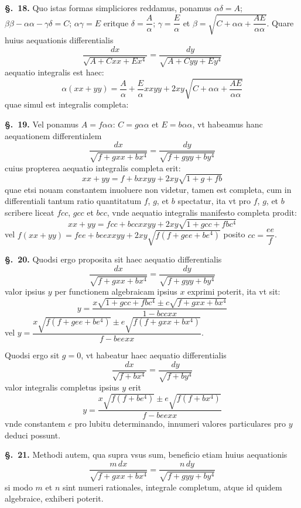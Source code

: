 \documentclass{article}
\begin{document}
\textbf{§.~18.} Quo istas formas simpliciores reddamus, ponamus $\alpha\delta = A$;
$\beta\beta - \alpha\alpha - \gamma\delta = C$; $\alpha\gamma = E$ eritque $\delta = \dfrac{A}{\alpha}$;
$\gamma = \dfrac{E}{\alpha}$ et $\beta = \sqrt{C + \alpha\alpha + \dfrac{AE}{\alpha\alpha}}$. Quare huius
aequationis differentialis
\[ \frac{dx}{\sqrt{A + Cxx + Ex^{4}}} = \frac{dy}{\sqrt{A + Cyy + Ey^{4}}} \tag{6} \]
aequatio integralis est haec:
\[ \alpha(xx + yy) = \frac{A}{\alpha} + \frac{E}{\alpha}xxyy + 2xy\sqrt{C + \alpha\alpha + \frac{AE}{\alpha\alpha}} \tag{7} \]
quae simul est integralis completa:

\textbf{§.~19.} Vel ponamus $A = f\alpha\alpha$: $C = g\alpha\alpha$ et $E = b\alpha\alpha$, vt
habeamus hanc aequationem differentialem
\[ \frac{dx}{\sqrt{f + gxx + bx^{4}}} = \frac{dy}{\sqrt{f + gyy + by^{4}}} \]
cuius propterea aequatio integralis completa erit:
\[ xx + yy = f + bxxyy + 2xy\sqrt{1 + g + fb} \]
quae etsi nouam constantem inuoluere non videtur, tamen est completa, cum in differentiali tantum
ratio quantitatum $f$, $g$, et $b$ spectatur, ita vt pro $f$, $g$, et $b$ scribere liceat $fcc$,
$gcc$ et $bcc$, vnde aequatio integralis manifesto completa prodit:
\[ xx + yy = fcc + bccxxyy + 2xy\sqrt{1 + gcc + fbc^{4}} \]
vel $f(xx + yy) = fee + beexxyy + 2xy\sqrt{f(f + gee + be^{4})}$ posito $cc = \dfrac{ee}{f}$.

\textbf{§.~20.} Quodsi ergo proposita sit haec aequatio differentialis
\[ \frac{dx}{\sqrt{f + gxx + bx^{4}}} = \frac{dy}{\sqrt{f + gyy + by^{4}}} \]
valor ipsius $y$ per functionem algebraicam ipsius $x$ exprimi poterit, ita vt sit:
\[ y = \frac{x\sqrt{1 + gcc + fbc^{4}} \pm c\sqrt{f + gxx + bx^{4}}}{1 - bccxx} \]
vel $y = \dfrac{x\sqrt{f(f + gee + be^{4})} \pm e\sqrt{f(f + gxx + bx^{4})}}{f - beexx}$.

Quodsi ergo sit $g = 0$, vt habeatur haec aequatio differentialis
\[ \frac{dx}{\sqrt{f + bx^{4}}} = \frac{dy}{\sqrt{f + by^{4}}} \]
valor integralis completus ipsius $y$ erit
\[ y = \frac{x\sqrt{f(f + be^{4})} \pm e\sqrt{f(f + bx^{4})}}{f - beexx} \]
vnde constantem $e$ pro lubitu determinando, innumeri valores particulares pro $y$ deduci possunt.

\textbf{§.~21.} Methodi autem, qua supra vsus sum, beneficio etiam huius aequationis
\[ \frac{m\,dx}{\sqrt{f + gxx + bx^{4}}} = \frac{n\,dy}{\sqrt{f + gyy + by^{4}}} \]
si modo $m$ et $n$ sint numeri rationales, integrale completum, atque id quidem algebraice,
exhiberi poterit.
\end{document}
